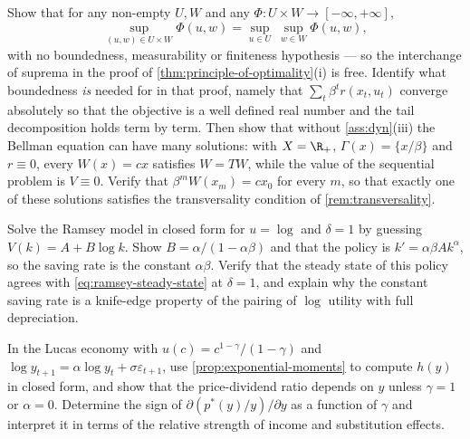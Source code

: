 \begin{exercise}\label{ex:dyn-1}
	Show that for any non-empty $U,W$ and any
	$\Phi\colon U\times W\to[-\infty,+\infty]$,
	\[
		\sup_{(u,w)\in U\times W}\Phi(u,w)=\sup_{u\in U}\ \sup_{w\in W}\Phi(u,w),
	\]
	with no boundedness, measurability or finiteness hypothesis --- so the interchange of
	suprema in the proof of \autoref{thm:principle-of-optimality}(i) is free.
	Identify what boundedness \emph{is} needed for in that proof, namely that
	$\sum_t\beta^{t}r(x_t,u_t)$ converge absolutely so that the objective is a well
	defined real number and the tail decomposition holds term by term. Then show
	that without \autoref{ass:dyn}(iii) the Bellman equation can have many
	solutions: with $X=\R_+$, $\Gamma(x)=\{x/\beta\}$ and $r\equiv0$, every
	$W(x)=cx$ satisfies $W=TW$, while the value of the sequential problem is
	$V\equiv0$. Verify that $\beta^{m}W(x_m)=cx_0$ for every $m$, so that exactly
	one of these solutions satisfies the transversality condition of
	\autoref{rem:transversality}.
\end{exercise}

\begin{exercise}\label{ex:dyn-2}
	Solve the Ramsey model in closed form for $u=\log$ and $\delta=1$ by guessing
	$V(k)=A+B\log k$. Show $B=\alpha/(1-\alpha\beta)$ and that the policy is
	$k'=\alpha\beta Ak^{\alpha}$, so the saving rate is the constant $\alpha\beta$.
	Verify that the steady state of this policy agrees with
	\eqref{eq:ramsey-steady-state} at $\delta=1$, and explain why the constant
	saving rate is a knife-edge property of the pairing of $\log$ utility with
	full depreciation.
\end{exercise}

\begin{exercise}\label{ex:dyn-3}
	In the Lucas economy with $u(c)=c^{1-\gamma}/(1-\gamma)$ and
	$\log y_{t+1}=\alpha\log y_t+\sigma\varepsilon_{t+1}$, use
	\autoref{prop:exponential-moments} to compute $h(y)$ in closed form, and show
	that the price-dividend ratio depends on $y$ unless $\gamma=1$ or $\alpha=0$.
	Determine the sign of $\partial(p^{\ast}(y)/y)/\partial y$ as a function of
	$\gamma$ and interpret it in terms of the relative strength of income and
	substitution effects.
\end{exercise}
